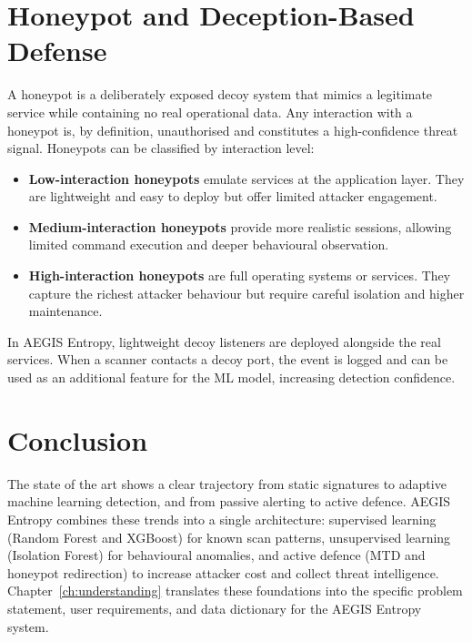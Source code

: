 \section{Honeypot and Deception-Based Defense}\label{sec:honeypot}

A honeypot is a deliberately exposed decoy system that mimics a legitimate service while containing no real operational data. Any interaction with a honeypot is, by definition, unauthorised and constitutes a high-confidence threat signal. Honeypots can be classified by interaction level:

\begin{itemize}
    \item \textbf{Low-interaction honeypots} emulate services at the application layer. They are lightweight and easy to deploy but offer limited attacker engagement.
    \item \textbf{Medium-interaction honeypots} provide more realistic sessions, allowing limited command execution and deeper behavioural observation.
    \item \textbf{High-interaction honeypots} are full operating systems or services. They capture the richest attacker behaviour but require careful isolation and higher maintenance.
\end{itemize}

In AEGIS Entropy, lightweight decoy listeners are deployed alongside the real services. When a scanner contacts a decoy port, the event is logged and can be used as an additional feature for the ML model, increasing detection confidence.

\section{Conclusion}\label{sec:soa_conclusion}

The state of the art shows a clear trajectory from static signatures to adaptive machine learning detection, and from passive alerting to active defence. AEGIS Entropy combines these trends into a single architecture: supervised learning (Random Forest and XGBoost) for known scan patterns, unsupervised learning (Isolation Forest) for behavioural anomalies, and active defence (MTD and honeypot redirection) to increase attacker cost and collect threat intelligence. Chapter~\ref{ch:understanding} translates these foundations into the specific problem statement, user requirements, and data dictionary for the AEGIS Entropy system.
